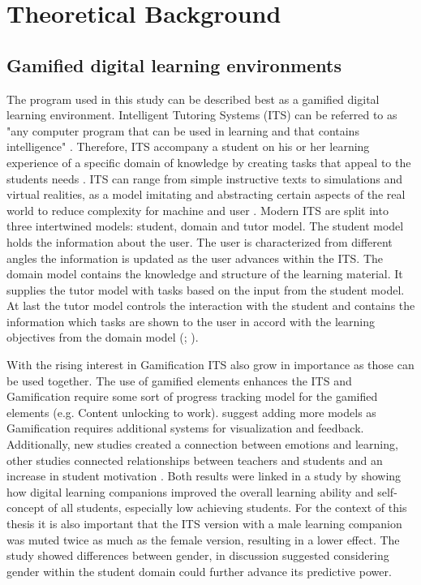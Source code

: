 \section{Theoretical Background}

\subsection{Gamified digital learning environments}
The program used in this study can be described best as a gamified digital learning environment.
Intelligent Tutoring Systems (ITS) can be referred to as "any computer program that can be used in learning and that contains intelligence" \>\parencite{freedmanLinksWhatIntelligent2000}.
Therefore, ITS accompany a student on his or her learning experience of a specific domain of knowledge by creating tasks that appeal to the students needs \parencite{gonzalezGamificationIntelligentTutoring2014}.
ITS can range from simple instructive texts to simulations and virtual realities, as a model imitating and abstracting certain aspects of the real world to reduce complexity for machine and user \parencite{psotkaIntelligentTutoringSystems1988}.
Modern ITS are split into three intertwined models: student, domain and tutor model. The student model holds the information about the user.
The user is characterized from different angles the information is updated as the user advances within the ITS.
The domain model contains the knowledge and structure of the learning material. It supplies the tutor model with tasks based on the input from the student model.
At last the tutor model controls the interaction with the student and contains the information which tasks are shown to the user in accord with the learning objectives from the domain model (\cite{gonzalezGamificationIntelligentTutoring2014}; \cite{freedmanLinksWhatIntelligent2000}).

With the rising interest in Gamification ITS also grow in importance as those can be used together. The use of gamified elements enhances the ITS and Gamification require some sort of progress tracking model for the gamified elements (e.g. Content unlocking to work).
\Textcite{gonzalezGamificationIntelligentTutoring2014} suggest adding more models as Gamification requires additional systems for visualization and feedback.
Additionally, new studies created a connection between emotions and learning, other studies connected relationships between teachers and students and an increase in student motivation \parencite{woolfAffectiveTutorsAutomatic2010}.
Both results were linked in a study by \Textcite{woolfAffectiveTutorsAutomatic2010} showing how digital learning companions improved the overall learning ability and self-concept of all students, especially low achieving students.
For the context of this thesis it is also important that the ITS version with a male learning companion was muted twice as much as the female version, resulting in a lower effect.
The study showed differences between gender, in discussion \Textcite{woolfAffectiveTutorsAutomatic2010} suggested considering gender within the student domain could further advance its predictive power.

